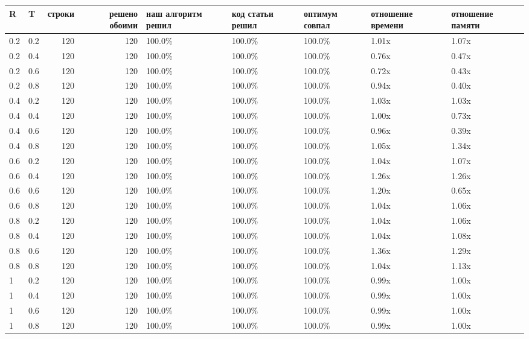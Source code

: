 \begin{tabular}{llrrlllll}
\toprule
R & T & строки & решено обоими & наш алгоритм решил & код статьи решил & оптимум совпал & отношение времени & отношение памяти \\
\midrule
0.2 & 0.2 & 120 & 120 & 100.0\% & 100.0\% & 100.0\% & 1.01x & 1.07x \\
0.2 & 0.4 & 120 & 120 & 100.0\% & 100.0\% & 100.0\% & 0.76x & 0.47x \\
0.2 & 0.6 & 120 & 120 & 100.0\% & 100.0\% & 100.0\% & 0.72x & 0.43x \\
0.2 & 0.8 & 120 & 120 & 100.0\% & 100.0\% & 100.0\% & 0.94x & 0.40x \\
0.4 & 0.2 & 120 & 120 & 100.0\% & 100.0\% & 100.0\% & 1.03x & 1.03x \\
0.4 & 0.4 & 120 & 120 & 100.0\% & 100.0\% & 100.0\% & 1.00x & 0.73x \\
0.4 & 0.6 & 120 & 120 & 100.0\% & 100.0\% & 100.0\% & 0.96x & 0.39x \\
0.4 & 0.8 & 120 & 120 & 100.0\% & 100.0\% & 100.0\% & 1.05x & 1.34x \\
0.6 & 0.2 & 120 & 120 & 100.0\% & 100.0\% & 100.0\% & 1.04x & 1.07x \\
0.6 & 0.4 & 120 & 120 & 100.0\% & 100.0\% & 100.0\% & 1.26x & 1.26x \\
0.6 & 0.6 & 120 & 120 & 100.0\% & 100.0\% & 100.0\% & 1.20x & 0.65x \\
0.6 & 0.8 & 120 & 120 & 100.0\% & 100.0\% & 100.0\% & 1.04x & 1.06x \\
0.8 & 0.2 & 120 & 120 & 100.0\% & 100.0\% & 100.0\% & 1.04x & 1.06x \\
0.8 & 0.4 & 120 & 120 & 100.0\% & 100.0\% & 100.0\% & 1.04x & 1.08x \\
0.8 & 0.6 & 120 & 120 & 100.0\% & 100.0\% & 100.0\% & 1.36x & 1.29x \\
0.8 & 0.8 & 120 & 120 & 100.0\% & 100.0\% & 100.0\% & 1.04x & 1.13x \\
1 & 0.2 & 120 & 120 & 100.0\% & 100.0\% & 100.0\% & 0.99x & 1.00x \\
1 & 0.4 & 120 & 120 & 100.0\% & 100.0\% & 100.0\% & 0.99x & 1.00x \\
1 & 0.6 & 120 & 120 & 100.0\% & 100.0\% & 100.0\% & 0.99x & 1.00x \\
1 & 0.8 & 120 & 120 & 100.0\% & 100.0\% & 100.0\% & 0.99x & 1.00x \\
\bottomrule
\end{tabular}

